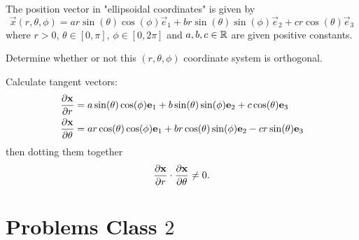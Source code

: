 \documentclass[10pt, a4paper]{article}
\begin{document}
\begin{problem}
    The position vector in
    "ellipsoidal coordinates"
    is given by
    \[
    \vec{x}(r, \theta, \phi) = ar\sin(\theta)\cos(\phi)\vec{e}_1 + br\sin(\theta)\sin(\phi)\vec{e}_2 + cr\cos(\theta)\vec{e}_3
    \]
    where $r > 0$,
    $\theta \in [0, \pi]$,
    $\phi \in [0, 2\pi]$ and $a, b, c \in \R$ are given positive constants.

    Determine whether or not this $(r, \theta, \phi)$ coordinate system is orthogonal.

    \begin{solution}
        Calculate tangent vectors:
        \begin{align*}
            \pd[\vec{x}]{r} &= a\sin(\theta)\cos(\phi)\vec{e}_1 + b\sin(\theta)\sin(\phi)\vec{e}_2 + c\cos(\theta)\vec{e}_3 \\
            \pd[\vec{x}]{\theta} &= ar\cos(\theta)\cos(\phi)\vec{e}_1 + br\cos(\theta)\sin(\phi)\vec{e}_2 - cr\sin(\theta)\vec{e}_3
        \end{align*}
        then dotting them together
        \[
        \pd[\vec{x}]{r} \cdot \pd[\vec{x}]{\theta} \neq 0.
        \]
    \end{solution}
\end{problem}

\newpage

\section{Problems Class \texorpdfstring{$2$}{}}
\end{document}
